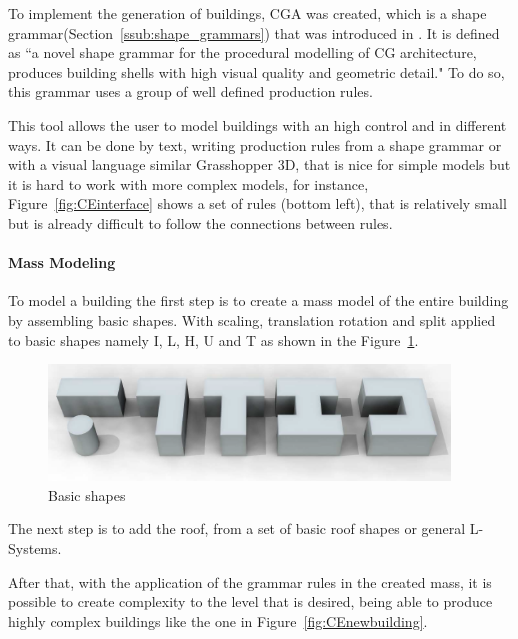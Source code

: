 To implement the generation of buildings, CGA was created, which is a shape grammar(Section~\ref{ssub:shape_grammars}) that was introduced in \cite{Parish2001}. It is defined as ``a novel shape grammar for the procedural modelling of CG architecture, produces building shells with high visual quality and geometric detail." To do so, this grammar uses a group of well defined production rules.

This tool allows the user to model buildings with an high control and in different ways. It can be done by text, writing production rules from a shape grammar or with a visual language similar Grasshopper 3D, that is nice for simple models but it is hard to work with more complex models, for instance, Figure~\ref{fig:CEinterface} shows a set of rules (bottom left), that is relatively small but is already difficult to follow the connections between rules.

\paragraph{Mass Modeling} %
\label{par:mass_modeling}
To model a building the first step is to create a mass model of the entire building by assembling basic shapes. With scaling, translation rotation and split applied to basic shapes namely I, L, H, U and T as shown in the Figure~\ref{fig:basic_shapes}.

\begin{figure}[htbp]
  \centering
  \includegraphics[width=0.95\textwidth]{img/Procedural-Modeling-of-Cities/MassModeling2.png}
  \caption{Basic shapes}
  \label{fig:basic_shapes}
\end{figure}


The next step is to add the roof, from a set of basic roof shapes or general L-Systems.

After that, with the application of the grammar rules in the created mass, it is possible to create complexity to the level that is desired, being able to produce highly complex buildings like the one in Figure~\ref{fig:CEnewbuilding}.


